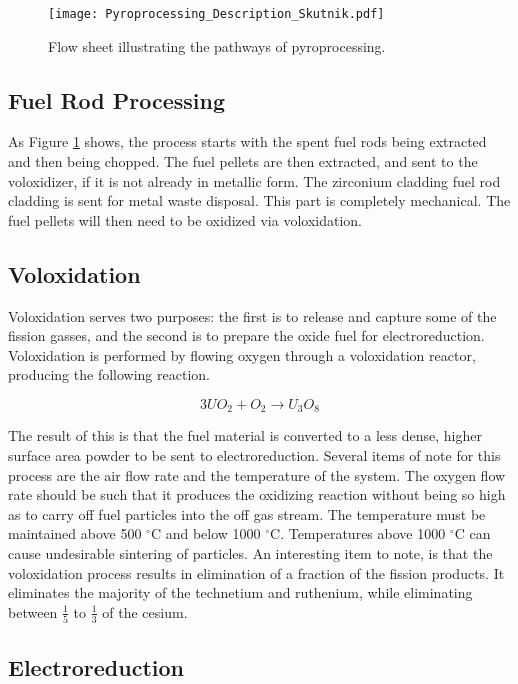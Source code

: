 \begin{figure}[h]
  \centering
  \texttt{[image: Pyroprocessing\_Description\_Skutnik.pdf]}
  \caption{Flow sheet illustrating the pathways of pyroprocessing.}
  \label{pyro_flow}
\end{figure} 

\newpage

\subsection{Fuel Rod Processing}
As Figure \ref{pyro_flow} shows, the process starts with the spent fuel rods being extracted and then being chopped. The fuel pellets are then extracted, and sent to the voloxidizer, if it is not already in metallic form. The zirconium cladding fuel rod cladding is sent for metal waste disposal. This part is completely mechanical. The fuel pellets will then need to be oxidized via voloxidation. 

\subsection{Voloxidation}

Voloxidation serves two purposes: the first is to release and capture some of the fission gasses, and the second is to prepare the oxide fuel for electroreduction. Voloxidation is performed by flowing oxygen through a voloxidation reactor, producing the following reaction.

\begin{equation}
3UO_2 + O_2 \rightarrow U_3O_8
\end{equation}

The result of this is that the fuel material is converted to a less dense, higher surface area powder to be sent to electroreduction. Several items of note for this process are the air flow rate and the temperature of the system. The oxygen flow rate should be such that it produces the oxidizing reaction without being so high as to carry off fuel particles into the off gas stream. The temperature must be maintained above 500 $^{\circ}$C and below 1000 $^{\circ}$C. Temperatures above 1000 $^{\circ}$C can cause undesirable sintering of particles. An interesting item to note, is that the voloxidation process results in elimination of a fraction of the fission products. It eliminates the majority of the technetium and ruthenium, while eliminating between $\frac{1}{5}$ to $\frac{1}{3}$ of the cesium.


\subsection{Electroreduction}

